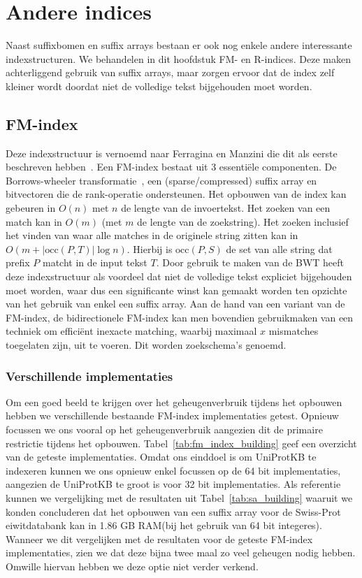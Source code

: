 \chapter{Andere indices}\label{ch:andere-indices}
Naast suffixbomen en suffix arrays bestaan er ook nog enkele andere interessante indexstructuren.
We behandelen in dit hoofdstuk FM- en R-indices.
Deze maken achterliggend gebruik van suffix arrays, maar zorgen ervoor dat de index zelf kleiner wordt doordat niet de volledige tekst bijgehouden moet worden.


\section{FM-index}
Deze indexstructuur is vernoemd naar Ferragina en Manzini die dit als eerste beschreven hebben~\cite{fm_index}.
Een FM-index bestaat uit 3 essentiële componenten.
De Borrows-wheeler transformatie~\cite{bwt}, een (sparse/compressed) suffix array en bitvectoren die de rank-operatie ondersteunen.
Het opbouwen van de index kan gebeuren in $O(n)$ met $n$ de lengte van de invoertekst.
Het zoeken van een match kan in $O(m)$ (met $m$ de lengte van de zoekstring).
Het zoeken inclusief het vinden van waar alle matches in de originele string zitten kan in $O(m + \text{|occ}(P, T)\text{|} \log n)$.
Hierbij is $\text{occ}(P, S)$ de set van alle string dat prefix $P$ matcht in de input tekst $T$.
Door gebruik te maken van de BWT heeft deze indexstructuur als voordeel dat niet de volledige tekst expliciet bijgehouden moet worden, waar dus een significante winst kan gemaakt worden ten opzichte van het gebruik van enkel een suffix array.
Aan de hand van een variant van de FM-index, de bidirectionele FM-index kan men bovendien gebruikmaken van een techniek om efficiënt inexacte matching, waarbij maximaal $x$ mismatches toegelaten zijn, uit te voeren.
Dit worden zoekschema's genoemd.

\subsection{Verschillende implementaties}
Om een goed beeld te krijgen over het geheugenverbruik tijdens het opbouwen hebben we verschillende bestaande FM-index implementaties getest.
Opnieuw focussen we ons vooral op het geheugenverbruik aangezien dit de primaire restrictie tijdens het opbouwen.
Tabel~\ref{tab:fm_index_building} geef een overzicht van de geteste implementaties.
Omdat ons einddoel is om UniProtKB te indexeren kunnen we ons opnieuw enkel focussen op de 64 bit implementaties, aangezien de UniProtKB te groot is voor 32 bit implementaties.
Als referentie kunnen we vergelijking met de resultaten uit Tabel~\ref{tab:sa_building} waaruit we konden concluderen dat het opbouwen van een suffix array voor de Swiss-Prot eiwitdatabank kan in 1.86 GB RAM\@ (bij het gebruik van 64 bit integeres).
Wanneer we dit vergelijken met de resultaten voor de geteste FM-index implementaties, zien we dat deze bijna twee maal zo veel geheugen nodig hebben.
Omwille hiervan hebben we deze optie niet verder verkend.

